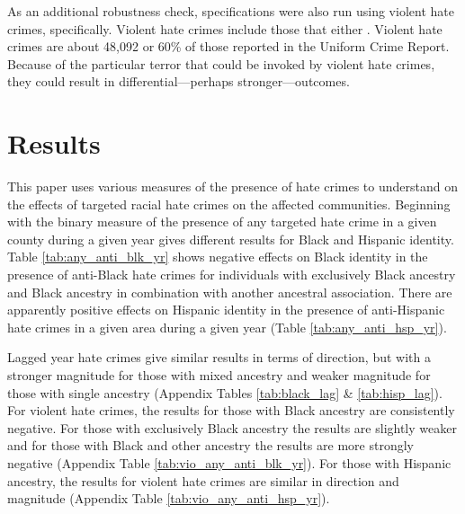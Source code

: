 \documentclass{article}
\begin{document}
    As an additional robustness check, specifications were also run using violent hate crimes, specifically. Violent hate crimes include those that either  \cite{ucr}. Violent hate crimes are about 48,092 or 60\% of those reported in the Uniform Crime Report. Because of the particular terror that could be invoked by violent hate crimes, they could result in differential---perhaps stronger---outcomes. 
    
\section{Results}

    This paper uses various measures of the presence of hate crimes to understand on the effects of targeted racial hate crimes on the affected communities. Beginning with the binary measure of the presence of any targeted hate crime in a given county during a given year gives different results for Black and Hispanic identity. Table \ref{tab:any_anti_blk_yr} shows negative effects on Black identity in the presence of anti-Black hate crimes for individuals with exclusively Black ancestry and Black ancestry in combination with another ancestral association. There are apparently positive effects on Hispanic identity in the presence of anti-Hispanic hate crimes in a given area during a given year (Table \ref{tab:any_anti_hsp_yr}). 
    
    Lagged year hate crimes give similar results in terms of direction, but with a stronger magnitude for those with mixed ancestry and weaker magnitude for those with single ancestry (Appendix Tables \ref{tab:black_lag} \& \ref{tab:hisp_lag}). For violent hate crimes, the results for those with Black ancestry are consistently negative. For those with exclusively Black ancestry the results are slightly weaker and for those with Black and other ancestry the results are more strongly negative (Appendix Table \ref{tab:vio_any_anti_blk_yr}). For those with Hispanic ancestry, the results for violent hate crimes are similar in direction and magnitude (Appendix Table \ref{tab:vio_any_anti_hsp_yr}).  
\end{document}
